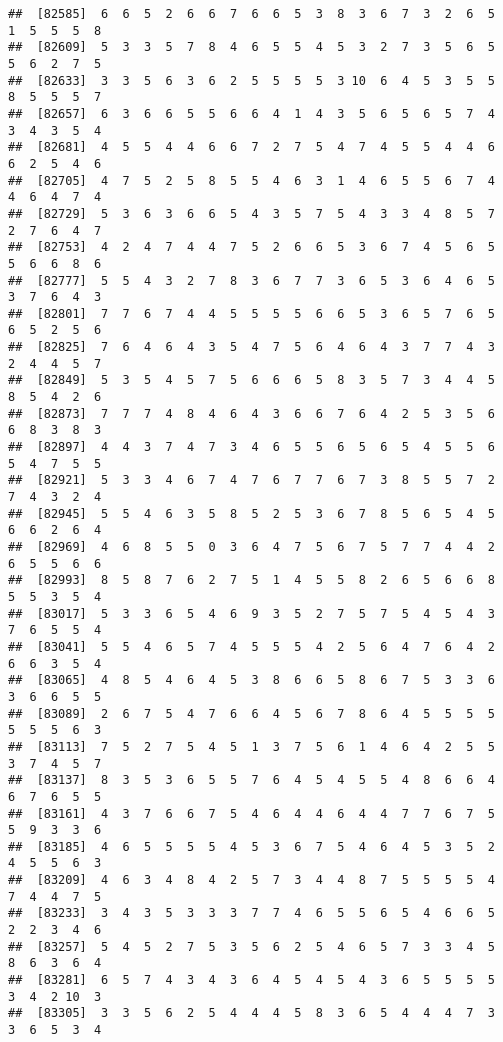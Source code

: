 \documentclass[
]{book}
\begin{document}
\begin{verbatim}
##  [82585]  6  6  5  2  6  6  7  6  6  5  3  8  3  6  7  3  2  6  5  1  5  5  5  8
##  [82609]  5  3  3  5  7  8  4  6  5  5  4  5  3  2  7  3  5  6  5  5  6  2  7  5
##  [82633]  3  3  5  6  3  6  2  5  5  5  5  3 10  6  4  5  3  5  5  8  5  5  5  7
##  [82657]  6  3  6  6  5  5  6  6  4  1  4  3  5  6  5  6  5  7  4  3  4  3  5  4
##  [82681]  4  5  5  4  4  6  6  7  2  7  5  4  7  4  5  5  4  4  6  6  2  5  4  6
##  [82705]  4  7  5  2  5  8  5  5  4  6  3  1  4  6  5  5  6  7  4  4  6  4  7  4
##  [82729]  5  3  6  3  6  6  5  4  3  5  7  5  4  3  3  4  8  5  7  2  7  6  4  7
##  [82753]  4  2  4  7  4  4  7  5  2  6  6  5  3  6  7  4  5  6  5  5  6  6  8  6
##  [82777]  5  5  4  3  2  7  8  3  6  7  7  3  6  5  3  6  4  6  5  3  7  6  4  3
##  [82801]  7  7  6  7  4  4  5  5  5  5  6  6  5  3  6  5  7  6  5  6  5  2  5  6
##  [82825]  7  6  4  6  4  3  5  4  7  5  6  4  6  4  3  7  7  4  3  2  4  4  5  7
##  [82849]  5  3  5  4  5  7  5  6  6  6  5  8  3  5  7  3  4  4  5  8  5  4  2  6
##  [82873]  7  7  7  4  8  4  6  4  3  6  6  7  6  4  2  5  3  5  6  6  8  3  8  3
##  [82897]  4  4  3  7  4  7  3  4  6  5  5  6  5  6  5  4  5  5  6  5  4  7  5  5
##  [82921]  5  3  3  4  6  7  4  7  6  7  7  6  7  3  8  5  5  7  2  7  4  3  2  4
##  [82945]  5  5  4  6  3  5  8  5  2  5  3  6  7  8  5  6  5  4  5  6  6  2  6  4
##  [82969]  4  6  8  5  5  0  3  6  4  7  5  6  7  5  7  7  4  4  2  6  5  5  6  6
##  [82993]  8  5  8  7  6  2  7  5  1  4  5  5  8  2  6  5  6  6  8  5  5  3  5  4
##  [83017]  5  3  3  6  5  4  6  9  3  5  2  7  5  7  5  4  5  4  3  7  6  5  5  4
##  [83041]  5  5  4  6  5  7  4  5  5  5  4  2  5  6  4  7  6  4  2  6  6  3  5  4
##  [83065]  4  8  5  4  6  4  5  3  8  6  6  5  8  6  7  5  3  3  6  3  6  6  5  5
##  [83089]  2  6  7  5  4  7  6  6  4  5  6  7  8  6  4  5  5  5  5  5  5  5  6  3
##  [83113]  7  5  2  7  5  4  5  1  3  7  5  6  1  4  6  4  2  5  5  3  7  4  5  7
##  [83137]  8  3  5  3  6  5  5  7  6  4  5  4  5  5  4  8  6  6  4  6  7  6  5  5
##  [83161]  4  3  7  6  6  7  5  4  6  4  4  6  4  4  7  7  6  7  5  5  9  3  3  6
##  [83185]  4  6  5  5  5  5  4  5  3  6  7  5  4  6  4  5  3  5  2  4  5  5  6  3
##  [83209]  4  6  3  4  8  4  2  5  7  3  4  4  8  7  5  5  5  5  4  7  4  4  7  5
##  [83233]  3  4  3  5  3  3  3  7  7  4  6  5  5  6  5  4  6  6  5  2  2  3  4  6
##  [83257]  5  4  5  2  7  5  3  5  6  2  5  4  6  5  7  3  3  4  5  8  6  3  6  4
##  [83281]  6  5  7  4  3  4  3  6  4  5  4  5  4  3  6  5  5  5  5  3  4  2 10  3
##  [83305]  3  3  5  6  2  5  4  4  4  5  8  3  6  5  4  4  4  7  3  3  6  5  3  4

\end{verbatim}
\end{document}
